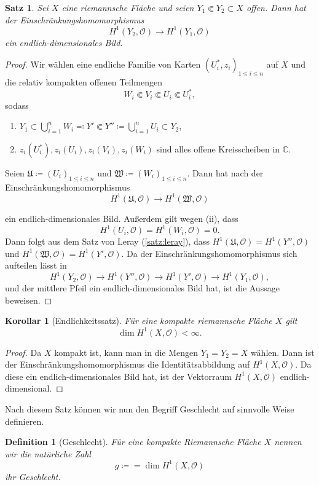 \documentclass[11pt,a4paper,toc=bibliography]{scrartcl}
\theoremstyle{thm}
\newtheorem{satz}{Satz}[section]
\newtheorem{koro}{Korollar}[section]
\theoremstyle{def}
\newtheorem{defi}{Definition}[section]
\theoremstyle{remark}
\begin{document}
\begin{satz}
Sei $X$ eine riemannsche Fläche und seien $Y_1\Subset Y_2\subset X$ offen. Dann hat der Einschränkungshomomorphismus
\[
H^1(Y_2,\mathcal{O})\rightarrow H^1(Y_1,\mathcal{O})
\]
ein endlich-dimensionales Bild.
\end{satz}
\begin{proof}
Wir wählen eine endliche Familie von Karten $(U_i^*,z_i)_{1\leq i\leq n}$ auf $X$ und die relativ kompakten offenen Teilmengen
\[
W_i\Subset V_i\Subset U_i\Subset U_i^*,
\] 
sodass 
\begin{enumerate}
\item $Y_1\subset \bigcup_{i=1}^n W_i \eqqcolon Y'\Subset Y''\coloneqq \bigcup_{i=1}^n U_i\subset Y_2$,
\item $z_i(U_i^*),z_i(U_i),z_i(V_i),z_i(W_i)$ sind alles offene Kreisscheiben in $\mathbb{C}$.
\end{enumerate}
Seien $\mathfrak{U}\coloneqq (U_i)_{1\leq i\leq n}$ und $\mathfrak{W}\coloneqq (W_i)_{1\leq i\leq n}$. Dann hat nach  der Einschränkungshomomorphismus
\[
H^1(\mathfrak{U},\mathcal{O})\rightarrow H^1(\mathfrak{W},\mathcal{O})
\]

ein endlich-dimensionales Bild. Außerdem gilt wegen  (ii), dass \[H^1(U_i,\mathcal{O})=H^1(W_i,\mathcal{O})=0.\] 
Dann folgt aus dem Satz von Leray (\ref{satz:leray}), dass $H^1(\mathfrak{U},\mathcal{O})=H^1(Y'',\mathcal{O})$ und $H^1(\mathfrak{W},\mathcal{O})=H^1(Y',\mathcal{O})$. Da der Einschränkungshomomorphismus sich aufteilen lässt in 
\[
H^1(Y_2,\mathcal{O})\rightarrow H^1(Y'',\mathcal{O})\rightarrow H^1(Y',\mathcal{O})\rightarrow H^1(Y_1,\mathcal{O}),
\]
 und der mittlere Pfeil ein endlich-dimensionales Bild hat, ist die Aussage beweisen.
\end{proof}
\begin{koro}[Endlichkeitssatz]
Für eine kompakte riemannsche Fläche $X$ gilt 
\[
\dim H^1(X,\mathcal{O})<\infty.
\]
\end{koro}
\begin{proof}
Da $X$ kompakt ist, kann man in  die Mengen $Y_1=Y_2=X$ wählen. Dann ist der Einschränkungshomomorphismus die Identitätsabbildung auf $H^1(X,\mathcal{O})$. Da diese ein endlich-dimensionales Bild hat, ist der Vektorraum $H^1(X,\mathcal{O})$ endlich-dimensional.
\end{proof}
Nach diesem Satz können wir nun den Begriff Geschlecht auf sinnvolle Weise definieren.
\begin{defi}[Geschlecht]
	Für eine kompakte Riemannsche Fläche $X$ nennen wir die  natürliche Zahl
	 \[
	 g\coloneqq = \dim H^1(X,\mathcal{O})
	\]
	ihr \emph{Geschlecht}.
\end{defi}
\end{document}
